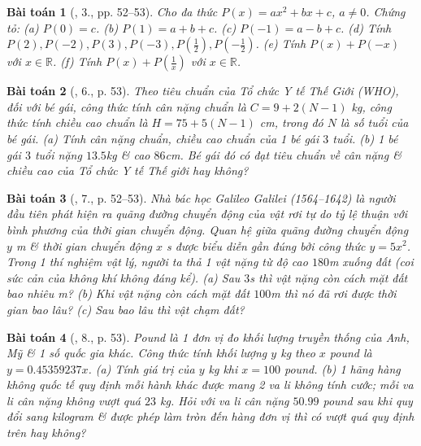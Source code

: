 \documentclass{article}
\newtheorem{baitoan}{Bài toán}
\begin{document}
\begin{baitoan}[\cite{SGK_Toan_7_Canh_Dieu_tap_2}, 3., pp. 52--53]
	Cho đa thức $P(x) = ax^2 + bx + c$, $a\ne0$. Chứng tỏ: (a) $P(0) = c$. (b) $P(1) = a + b + c$. (c) $P(-1) = a - b + c$. (d) Tính $P(2),P(-2),P(3),P(-3),P\left(\frac{1}{2}\right),P\left(-\frac{1}{2}\right)$. (e) Tính $P(x) + P(-x)$ với $x\in\mathbb{R}$. (f) Tính $P(x) + P\left(\frac{1}{x}\right)$ với $x\in\mathbb{R}$.
\end{baitoan}

\begin{baitoan}[\cite{SGK_Toan_7_Canh_Dieu_tap_2}, 6., p. 53]
	Theo tiêu chuẩn của Tổ chức Y tế Thế Giới (WHO), đối với bé gái, công thức tính cân nặng chuẩn là $C = 9 + 2(N - 1)$ \emph{kg}, công thức tính chiều cao chuẩn là $H = 75 + 5(N - 1)$ \emph{cm}, trong đó $N$ là số tuổi của bé gái. (a) Tính cân nặng chuẩn, chiều cao chuẩn của 1 bé gái $3$ tuổi. (b) 1 bé gái $3$ tuổi nặng $13.5$\emph{kg} \& cao $86$\emph{cm}. Bé gái đó có đạt tiêu chuẩn về cân nặng \& chiều cao của Tổ chức Y tế Thế giới hay không?
\end{baitoan}

\begin{baitoan}[\cite{SGK_Toan_7_Canh_Dieu_tap_2}, 7., p. 52--53]
	Nhà bác học Galileo Galilei (1564--1642) là người đầu tiên phát hiện ra quãng đường chuyển động của vật rơi tự do tỷ lệ thuận với bình phương của thời gian chuyển động. Quan hệ giữa quãng đường chuyển động $y$ \emph{m} \& thời gian chuyển động $x$ \emph{s} được biểu diễn gần đúng bởi công thức $y = 5x^2$. Trong 1 thí nghiệm vật lý, người ta thả 1 vật nặng từ độ cao $180$\emph{m} xuống đất (coi sức cản của không khí không đáng kể). (a) Sau $3$\emph{s} thì vật nặng còn cách mặt đất bao nhiêu \emph{m}? (b) Khi vật nặng còn cách mặt đất $100$\emph{m} thì nó đã rơi được thời gian bao lâu? (c) Sau bao lâu thì vật chạm đất?
\end{baitoan}

\begin{baitoan}[\cite{SGK_Toan_7_Canh_Dieu_tap_2}, 8., p. 53]
	Pound là 1 đơn vị đo khối lượng truyền thống của Anh, Mỹ \& 1 số quốc gia khác. Công thức tính khối lượng $y$ \emph{kg} theo $x$ pound là $y = 0.45359237x$. (a) Tính giá trị của $y$ \emph{kg} khi $x = 100$ pound. (b) 1 hãng hàng không quốc tế quy định mỗi hành khác được mang 2 va li không tính cước; mỗi va li cân nặng không vượt quá $23$ \emph{kg}. Hỏi với va li cân nặng $50.99$ pound sau khi quy đổi sang kilogram \& được phép làm tròn đến hàng đơn vị thì có vượt quá quy định trên hay không?
\end{baitoan}
\end{document}
